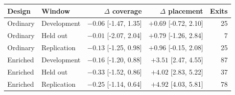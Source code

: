 \begin{tabular}{@{}llrrr@{}}\toprule
Design & Window & $\Delta$ coverage & $\Delta$ placement & Exits\\\midrule
Ordinary & Development & $-0.06$ [-1.47, 1.35] & $+0.69$ [-0.72, 2.10] & 25\\
Ordinary & Held out & $-0.01$ [-2.07, 2.04] & $+0.79$ [-1.26, 2.84] & 7\\
Ordinary & Replication & $-0.13$ [-1.25, 0.98] & $+0.96$ [-0.15, 2.08] & 25\\
Enriched & Development & $-0.16$ [-1.20, 0.88] & $+3.51$ [2.47, 4.55] & 87\\
Enriched & Held out & $-0.33$ [-1.52, 0.86] & $+4.02$ [2.83, 5.22] & 37\\
Enriched & Replication & $-0.25$ [-1.14, 0.64] & $+4.92$ [4.03, 5.81] & 78\\
\bottomrule\end{tabular}

